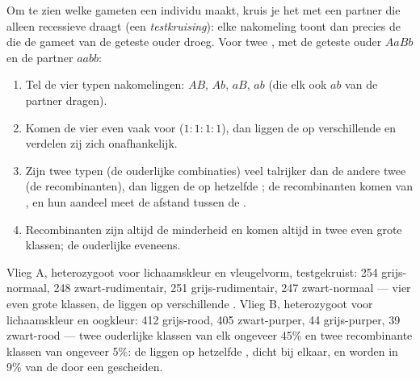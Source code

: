 \begin{method}[De testkruising]\label{met:g12:meiosis-genetic-shuffling:testcross}
Om te zien welke gameten een individu maakt, kruis je het met een partner
die alleen recessieve  draagt (een \emph{testkruising}): elke
nakomeling toont dan precies de  die de gameet van de geteste
ouder droeg. Voor twee , met de geteste ouder $AaBb$ en de partner
$aabb$:
\begin{enumerate}
  \item Tel de vier typen nakomelingen: $AB$, $Ab$, $aB$, $ab$ (die
        elk ook $ab$ van de partner dragen).
  \item Komen de vier even vaak voor ($1:1:1:1$), dan liggen de  op
        verschillende  en verdelen zij zich onafhankelijk.
  \item Zijn twee typen (de ouderlijke combinaties) veel talrijker dan
        de andere twee (de recombinanten), dan liggen de  op
        hetzelfde ; de recombinanten komen van ,
        en hun aandeel meet de afstand tussen de .
  \item Recombinanten zijn altijd de minderheid en komen altijd in twee
        even grote klassen; de ouderlijke eveneens.
\end{enumerate}
\end{method}

\begin{example}\label{ex:g12:meiosis-genetic-shuffling:fly}
Vlieg A, heterozygoot voor lichaamskleur en vleugelvorm, testgekruist:
254 grijs-normaal, 248 zwart-rudimentair, 251 grijs-rudimentair, 247
zwart-normaal --- vier even grote klassen, de  liggen op
verschillende . Vlieg B, heterozygoot voor lichaamskleur en
oogkleur: 412 grijs-rood, 405 zwart-purper, 44 grijs-purper, 39 zwart-rood
--- twee ouderlijke klassen van elk ongeveer 45\% en twee recombinante
klassen van ongeveer 5\%: de  liggen op hetzelfde , dicht
bij elkaar, en worden in 9\% van de  door een 
gescheiden.
\end{example}


